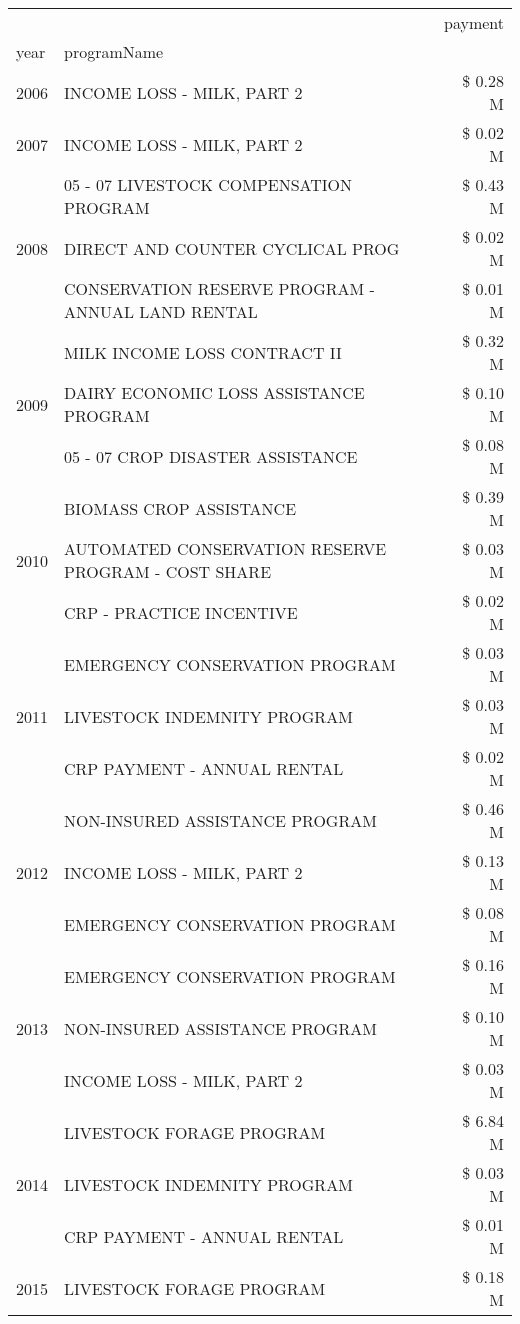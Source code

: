 \begin{tabular}{llr}
\toprule
 &  & payment \\
year & programName &  \\
\midrule
2006 & INCOME LOSS - MILK, PART 2 & \$ 0.28 M \\
\cline{1-3}
2007 & INCOME LOSS - MILK, PART 2 & \$ 0.02 M \\
\cline{1-3}
\multirow[t]{3}{*}{2008} & 05 - 07 LIVESTOCK COMPENSATION PROGRAM & \$ 0.43 M \\
 & DIRECT AND COUNTER CYCLICAL PROG & \$ 0.02 M \\
 & CONSERVATION RESERVE PROGRAM - ANNUAL LAND RENTAL & \$ 0.01 M \\
\cline{1-3}
\multirow[t]{3}{*}{2009} & MILK INCOME LOSS CONTRACT II & \$ 0.32 M \\
 & DAIRY ECONOMIC LOSS ASSISTANCE PROGRAM & \$ 0.10 M \\
 & 05 - 07 CROP DISASTER ASSISTANCE & \$ 0.08 M \\
\cline{1-3}
\multirow[t]{3}{*}{2010} & BIOMASS CROP ASSISTANCE & \$ 0.39 M \\
 & AUTOMATED CONSERVATION RESERVE PROGRAM - COST SHARE & \$ 0.03 M \\
 & CRP - PRACTICE INCENTIVE & \$ 0.02 M \\
\cline{1-3}
\multirow[t]{3}{*}{2011} & EMERGENCY CONSERVATION PROGRAM & \$ 0.03 M \\
 & LIVESTOCK INDEMNITY PROGRAM & \$ 0.03 M \\
 & CRP PAYMENT - ANNUAL RENTAL & \$ 0.02 M \\
\cline{1-3}
\multirow[t]{3}{*}{2012} & NON-INSURED ASSISTANCE PROGRAM & \$ 0.46 M \\
 & INCOME LOSS - MILK, PART 2 & \$ 0.13 M \\
 & EMERGENCY CONSERVATION PROGRAM & \$ 0.08 M \\
\cline{1-3}
\multirow[t]{3}{*}{2013} & EMERGENCY CONSERVATION PROGRAM & \$ 0.16 M \\
 & NON-INSURED ASSISTANCE PROGRAM & \$ 0.10 M \\
 & INCOME LOSS - MILK, PART 2 & \$ 0.03 M \\
\cline{1-3}
\multirow[t]{3}{*}{2014} & LIVESTOCK FORAGE PROGRAM & \$ 6.84 M \\
 & LIVESTOCK INDEMNITY PROGRAM & \$ 0.03 M \\
 & CRP PAYMENT - ANNUAL RENTAL & \$ 0.01 M \\
\cline{1-3}
\multirow[t]{3}{*}{2015} & LIVESTOCK FORAGE PROGRAM & \$ 0.18 M \\

\end{tabular}
